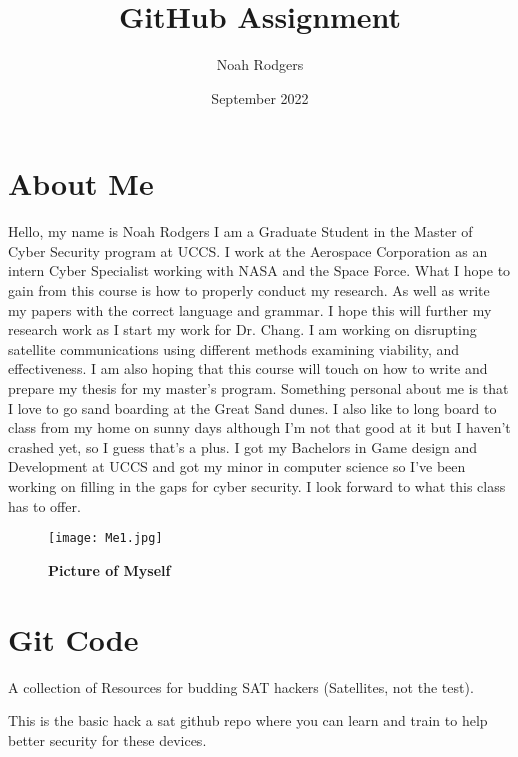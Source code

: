 
\title{GitHub Assignment}
\author{Noah Rodgers}
\date{September 2022}

%

\maketitle

\section{About Me}

Hello, my name is Noah Rodgers I am a Graduate Student in the Master of Cyber Security program at UCCS. I work at the Aerospace Corporation as an intern Cyber Specialist working with NASA and the Space Force. What I hope to gain from this course is how to properly conduct my research. As well as write my papers with the correct language and grammar. I hope this will further my research work as I start my work for Dr. Chang. I am working on disrupting satellite communications using different methods examining viability, and effectiveness. I am also hoping that this course will touch on how to write and prepare my thesis for my master’s program. Something personal about me is that I love to go sand boarding at the Great Sand dunes. I also like to long board to class from my home on sunny days although I’m not that good at it but I haven’t crashed yet, so I guess that’s a plus. I got my Bachelors in Game design and Development at UCCS and got my minor in computer science so I’ve been working on filling in the gaps for cyber security. I look forward to what this class has to offer.



\begin{figure}[!htb]
    \centering
    \texttt{[image: Me1.jpg]}
    \caption{\textbf{Picture of Myself}}
    \label{fig:jamequation}
\end{figure}


\section{Git Code}
A collection of Resources for budding SAT hackers (Satellites, not the test).

This is the basic hack a sat github repo where you can learn and train to help better security for these devices.

